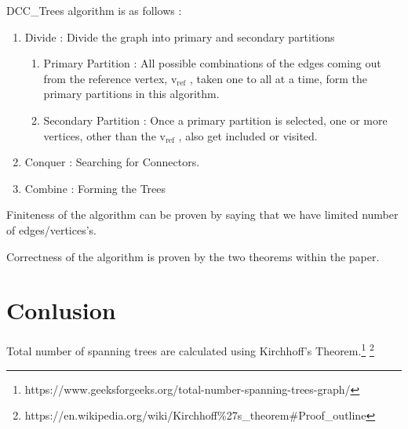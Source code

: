 \documentclass[11pt]{article}
\begin{document}
DCC\_Trees algorithm is as follows : \cite[chapter 2, p.~215]{berndStrumfelsBook}

\begin{enumerate}
\item Divide : Divide the graph into primary and secondary partitions
	\begin{enumerate}
		\item Primary Partition : All possible combinations of the edges coming out from the reference vertex, $\mathrm{v_{ref}}$ , taken one to all at a time, form the primary partitions in this algorithm.
		\item Secondary Partition  : Once a primary partition is selected, one or more vertices, other than the $\mathrm{v_{ref}}$ , also get included or visited.
	\end{enumerate}
\item Conquer : Searching for Connectors. 
\item Combine : Forming the Trees
\end{enumerate}


Finiteness of the algorithm can be proven by saying that we have limited number of edges/vertices's.

Correctness of the algorithm is proven by the two theorems within the paper. 




\section{Conlusion}
Total number of spanning trees are calculated using  Kirchhoff’s Theorem.\footnote{https://www.geeksforgeeks.org/total-number-spanning-trees-graph/}
\footnote{https://en.wikipedia.org/wiki/Kirchhoff\%27s\_theorem\#Proof\_outline}
\end{document}
